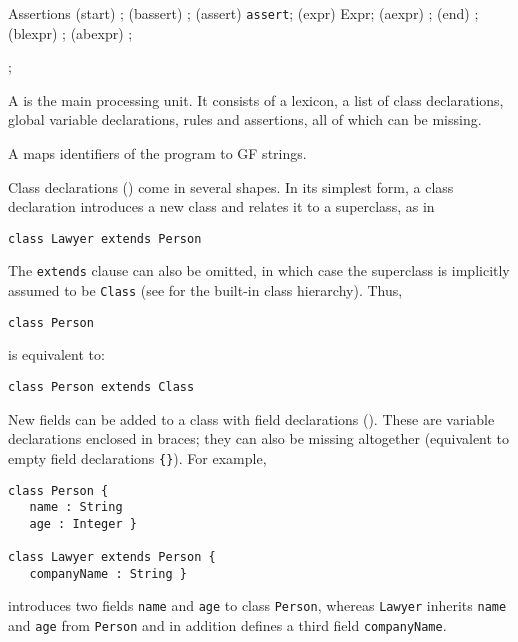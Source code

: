 \begin{syntaxdiagram}{Assertions}
  \node[junction,right=of Assertions] (start) {};
  \node[junction,right=of start] (bassert) {};
  \node[terminal,right=of bassert] (assert) {\texttt{assert}};
  \node[nonterminal,right=of assert] (expr) {Expr};
  \node[junction,right=of expr] (aexpr) {};
  \node[junction,right=of aexpr] (end) {};
  \node[junction,below=of expr] (blexpr) {};
  \node[junction,above=of expr] (abexpr) {};

;


\end{syntaxdiagram}


A  is the main processing unit. It consists of a
lexicon, a list of class declarations, global variable declarations, rules and
assertions, all of which can be missing.

A  maps identifiers of the program to GF
strings.

Class declarations () come in several shapes. In
its simplest form, a class declaration introduces a new class and relates it
to a superclass, as in
\begin{lstlisting}
class Lawyer extends Person
\end{lstlisting}  

The \texttt{extends} clause can also be omitted, in which case the superclass
is implicitly assumed to be \texttt{Class} (see  for the
built-in class hierarchy). Thus,
\begin{lstlisting}
class Person
\end{lstlisting}  
is equivalent to:
\begin{lstlisting}
class Person extends Class
\end{lstlisting}

New fields can be added to a class with field declarations
(). These are variable declarations
enclosed in braces; they can also be missing altogether (equivalent to empty
field declarations \texttt{\{\}}). For example, 
\begin{lstlisting}
class Person {
   name : String
   age : Integer }

class Lawyer extends Person {
   companyName : String }
\end{lstlisting}  
introduces two fields \texttt{name} and \texttt{age} to class \texttt{Person},
whereas \texttt{Lawyer} inherits \texttt{name} and \texttt{age} from
\texttt{Person} and in addition defines a third field \texttt{companyName}.

